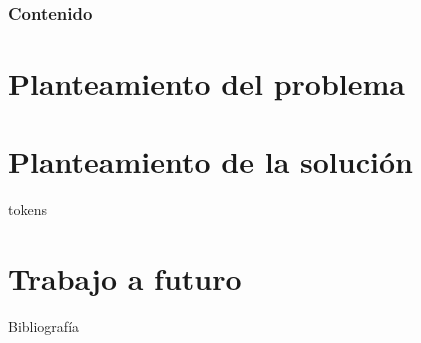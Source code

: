 \documentclass{beamer}
\begin{document}
  {
  \frame{\titlepage}}

  \begin{frame}
    \frametitle{Contenido}
    \setcounter{tocdepth}{1}
    \tableofcontents[pausesections]
  \end{frame}

  \setlength{\parskip}{0.5em}

  \section{Planteamiento del problema}

  \begin{frame}{}

  \end{frame}

  \section{Planteamiento de la solución}

  \begin{frame}{}

  \end{frame}

  {tokens}

  \section{Trabajo a futuro}

  \begin{frame}{}

  \end{frame}

  \begin{frame}[allowframebreaks]{Bibliografía}
    \printbibliography
  \end{frame}

  \setlength{\parskip}{0.0em}

  {
  \frame{\titlepage}}
\end{document}

